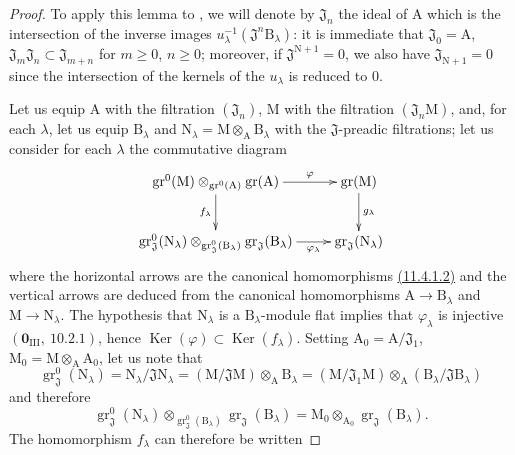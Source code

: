 \begin{proof}
To apply this lemma to , we will denote by $\mathfrak{J}_n$ the ideal of $\mathrm{A}$ which is the intersection
of the inverse images $u_\lambda^{-1}(\mathfrak{J}^n\mathrm{B}_\lambda)$: it is immediate that $\mathfrak{J}_0=\mathrm{A}$, $\mathfrak{J}_m\mathfrak{J}_n\subset\mathfrak{J}_{m+n}$
for $m\geq 0$, $n\geq 0$; moreover, if $\mathfrak{J}^{\mathrm{N}+1}=0$, we also have $\mathfrak{J}_{\mathrm{N}+1}=0$ since the intersection of the
kernels of the $u_\lambda$ is reduced to $0$.

Let us equip $\mathrm{A}$ with the filtration $(\mathfrak{J}_n)$, $\mathrm{M}$ with the filtration $(\mathfrak{J}_n\mathrm{M})$, and, for each $\lambda$,
let us equip $\mathrm{B}_\lambda$ and $\mathrm{N}_\lambda=\mathrm{M}\otimes_\mathrm{A}\mathrm{B}_\lambda$ with the $\mathfrak{J}$-preadic filtrations; let us consider for each $\lambda$ the
commutative diagram
\[
\xymatrix{
\operatorname{gr}^0(\mathrm{M})\otimes_{\operatorname{gr}^0(\mathrm{A})}\operatorname{gr}(\mathrm{A}) \ar[r]^-{\varphi} \ar[d]_{f_\lambda} & \operatorname{gr}(\mathrm{M}) \ar[d]^{g_\lambda} \\
\operatorname{gr}^0_\mathfrak{J}(\mathrm{N}_\lambda)\otimes_{\operatorname{gr}^0_\mathfrak{J}(\mathrm{B}_\lambda)}\operatorname{gr}_\mathfrak{J}(\mathrm{B}_\lambda) \ar[r]_-{\varphi_\lambda} & \operatorname{gr}_\mathfrak{J}(\mathrm{N}_\lambda)
}
\]
where the horizontal arrows are the canonical homomorphisms {\hyperlink{ega4.c04.lem.11-4-1-2}{(11.4.1.2)}} and the vertical
arrows are deduced from the canonical homomorphisms $\mathrm{A}\to\mathrm{B}_\lambda$ and $\mathrm{M}\to\mathrm{N}_\lambda$. The hypothesis
that $\mathrm{N}_\lambda$ is a $\mathrm{B}_\lambda$-module flat implies that $\varphi_\lambda$ is injective $(\mathbf{0}_{\mathrm{III}},~10.2.1)$, hence
$\operatorname{Ker}(\varphi)\subset\operatorname{Ker}(f_\lambda)$. Setting $\mathrm{A}_0=\mathrm{A}/\mathfrak{J}_1$, $\mathrm{M}_0=\mathrm{M}\otimes_\mathrm{A}\mathrm{A}_0$, let us note that
\[
\operatorname{gr}^0_\mathfrak{J}(\mathrm{N}_\lambda)=\mathrm{N}_\lambda/\mathfrak{J}\mathrm{N}_\lambda=(\mathrm{M}/\mathfrak{J}\mathrm{M})\otimes_\mathrm{A}\mathrm{B}_\lambda=(\mathrm{M}/\mathfrak{J}_1\mathrm{M})\otimes_{\mathrm{A}}(\mathrm{B}_\lambda/\mathfrak{J}\mathrm{B}_\lambda)
\]
and therefore
\[
\operatorname{gr}^0_\mathfrak{J}(\mathrm{N}_\lambda)\otimes_{\operatorname{gr}^0_\mathfrak{J}(\mathrm{B}_\lambda)}\operatorname{gr}_\mathfrak{J}(\mathrm{B}_\lambda)=\mathrm{M}_0\otimes_{\mathrm{A}_0}\operatorname{gr}_\mathfrak{J}(\mathrm{B}_\lambda).
\]
The homomorphism $f_\lambda$ can therefore be written

\end{proof}
